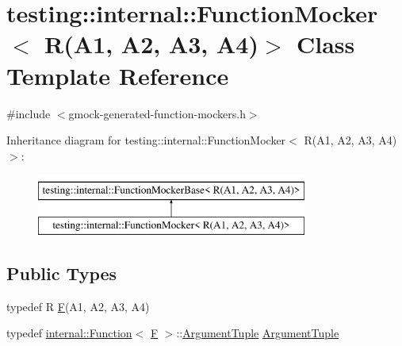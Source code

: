 \hypertarget{classtesting_1_1internal_1_1FunctionMocker_3_01R_07A1_00_01A2_00_01A3_00_01A4_08_4}{}\section{testing\+::internal\+::Function\+Mocker$<$ R(A1, A2, A3, A4)$>$ Class Template Reference}
\label{classtesting_1_1internal_1_1FunctionMocker_3_01R_07A1_00_01A2_00_01A3_00_01A4_08_4}


{\ttfamily \#include $<$gmock-\/generated-\/function-\/mockers.\+h$>$}

Inheritance diagram for testing\+::internal\+::Function\+Mocker$<$ R(A1, A2, A3, A4)$>$\+:\begin{figure}[H]
\begin{center}
\leavevmode
\includegraphics[height=2.000000cm]{classtesting_1_1internal_1_1FunctionMocker_3_01R_07A1_00_01A2_00_01A3_00_01A4_08_4}
\end{center}
\end{figure}
\subsection*{Public Types}
\begin{DoxyCompactItemize}
\item 
typedef R \mbox{\hyperlink{classtesting_1_1internal_1_1FunctionMocker_3_01R_07A1_00_01A2_00_01A3_00_01A4_08_4_a9be04bb962edb1458c857ca8e9db9318}{F}}(A1, A2, A3, A4)
\item 
typedef \mbox{\hyperlink{structtesting_1_1internal_1_1Function}{internal\+::\+Function}}$<$ \mbox{\hyperlink{classtesting_1_1internal_1_1FunctionMocker_3_01R_07A1_00_01A2_00_01A3_00_01A4_08_4_a9be04bb962edb1458c857ca8e9db9318}{F}} $>$\+::\mbox{\hyperlink{classtesting_1_1internal_1_1FunctionMocker_3_01R_07A1_00_01A2_00_01A3_00_01A4_08_4_a97576d71dfe85cbb0fc51fcaad6d4cc1}{Argument\+Tuple}} \mbox{\hyperlink{classtesting_1_1internal_1_1FunctionMocker_3_01R_07A1_00_01A2_00_01A3_00_01A4_08_4_a97576d71dfe85cbb0fc51fcaad6d4cc1}{Argument\+Tuple}}
\end{DoxyCompactItemize}
